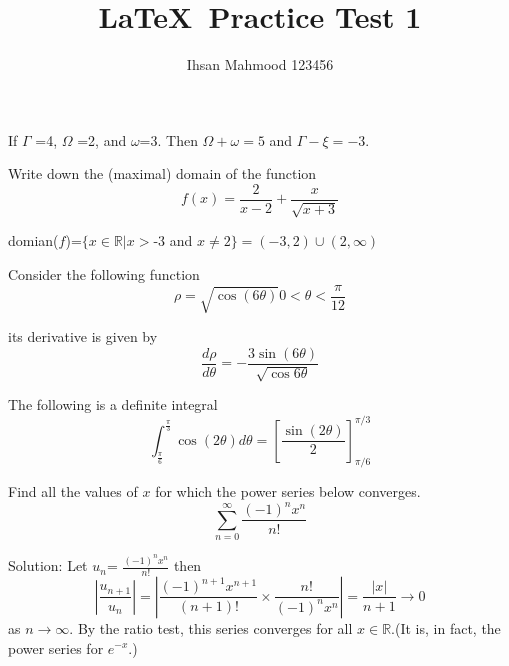 \documentclass[12pt,a4paper]{article}
\begin{document}
\title{\LaTeX ~Practice Test 1}
\author{Ihsan Mahmood 123456}
\maketitle

\par If $\Gamma$ =4, $\Omega$ =2, and $\omega$=3. Then $\displaystyle \Omega+\omega=5$ and $\displaystyle \Gamma- \xi= -3$.

\par {\parskip=6mm Write down the (maximal) domain of the function 
\begin{equation}
f(x)=\frac{2}{x-2}+\frac{x}{\sqrt{x+3}}
\end{equation}}

\par {\parindent=13mm \parskip=-4mm domian($f$)=$\{ x \in \mathbb{R} | x >$-3 and $x \neq 2 \}= (-3,2) \cup (2,\infty)$}

\par Consider the following function 
\begin{equation*}
\rho = \sqrt{\cos(6\theta)}0 < \theta < \frac{\pi}{12}
\end{equation*}

its derivative is given by
\begin{equation}
\frac{d\rho}{d\theta}= -\frac{3\sin(6\theta)}{\sqrt{\cos{6\theta}}}
\end{equation}

\par The following is a definite integral
\begin{equation}
\int^{\frac{\pi}{3}}_{\frac{\pi}{6}}\cos(2\theta)d\theta=\left[\frac{\sin(2\theta)}{2}\right] ^{\pi/3}_{\pi/6}
\end{equation}

\par Find all the values of $x$ for which the power series below converges.
\begin{equation}
\sum^{\infty}_{n=0}\frac{(-1)^nx^n}{n!}
\end{equation}

\par Solution: Let $u_n$= $\frac{(-1)^{n}{x}^{n}}{n!}$ then
\begin{equation*}
\left| \frac{u_{n+1}}{u_n}\right|=\left|\frac{(-1)^{n+1}x^{n+1}}{(n+1)!}\times \frac{n!}{(-1)^nx^n}\right|= \frac{|x|}{n+1} \rightarrow 0
\end{equation*}
as $n \rightarrow \infty$. By the ratio test, this series converges for all $x\in \mathbb{R}$.(It is, in fact, the power series for $e^{-x}$.)
\end{document}
